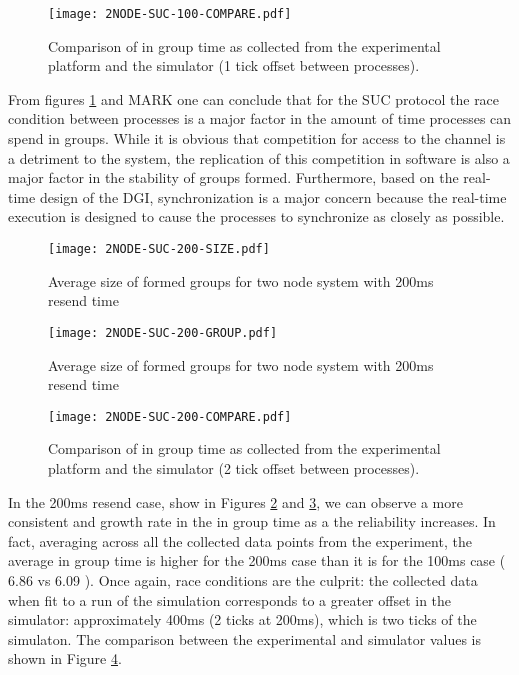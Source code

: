 \begin{figure}[!h]
\centering
\texttt{[image: 2NODE-SUC-100-COMPARE.pdf]}
\caption{Comparison of in group time as collected from the experimental platform and the simulator (1 tick offset between processes).}
\label{fig:COMPARE-SUC-2NODE-100}
\end{figure}

From figures \ref{fig:COMPARE-SUC-2NODE-100} and MARK one can conclude that for the SUC protocol the 
race condition between processes is a major factor in the amount of time processes
can spend in groups. While it is obvious that competition for access to the channel
is a detriment to the system, the replication of this competition in software is
also a major factor in the stability of groups formed. Furthermore, based on the 
real-time design of the DGI, synchronization is a major concern because the real-time
execution is designed to cause the processes to synchronize as closely as possible.

\begin{figure}[!h]
\centering
\texttt{[image: 2NODE-SUC-200-SIZE.pdf]}
\caption{Average size of formed groups for two node system with 200ms resend time}
\label{fig:MGS-SUC-2NODE-200}
\end{figure}

\begin{figure}[!h]
\centering
\texttt{[image: 2NODE-SUC-200-GROUP.pdf]}
\caption{Average size of formed groups for two node system with 200ms resend time}
\label{fig:IGT-SUC-2NODE-200}
\end{figure}

\begin{figure}[!h]
\centering
\texttt{[image: 2NODE-SUC-200-COMPARE.pdf]}
\caption{Comparison of in group time as collected from the experimental platform and the simulator (2 tick offset between processes).}
\label{fig:COMPARE-SUC-2NODE-200}
\end{figure}


In the 200ms resend case, show in Figures \ref{fig:MGS-SUC-2NODE-200} and \ref{fig:IGT-SUC-2NODE-200}, we can observe a more consistent and
growth rate in the in group time as a the reliability increases. In fact, averaging
across all the collected data points from the experiment, the average in group time
is higher for the 200ms case than it is for the 100ms case ( 6.86 vs 6.09 ). Once
again, race conditions are the culprit: the collected data when fit to a run of the
simulation corresponds to a greater offset in the simulator: approximately 400ms (2 ticks at 200ms),
which is two ticks of the simulaton. The comparison between the experimental and
simulator values is shown in Figure \ref{fig:COMPARE-SUC-2NODE-200}.


